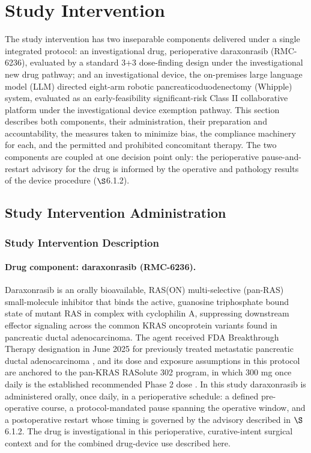 \section{Study Intervention}

The study intervention has two inseparable components delivered under a single
integrated protocol: an investigational drug, perioperative daraxonrasib
(RMC-6236), evaluated by a standard 3+3 dose-finding design under the
investigational new drug pathway; and an investigational device, the on-premises
large language model (LLM) directed eight-arm robotic pancreaticoduodenectomy
(Whipple) system, evaluated as an early-feasibility significant-risk Class II
collaborative platform under the investigational device exemption pathway. This
section describes both components, their administration, their preparation and
accountability, the measures taken to minimize bias, the compliance machinery for
each, and the permitted and prohibited concomitant therapy. The two components
are coupled at one decision point only: the perioperative pause-and-restart
advisory for the drug is informed by the operative and pathology results of the
device procedure ($\S$6.1.2).

\subsection{Study Intervention Administration}

\subsubsection{Study Intervention Description}

\paragraph{Drug component: daraxonrasib (RMC-6236).}
Daraxonrasib is an orally bioavailable, RAS(ON) multi-selective (pan-RAS)
small-molecule inhibitor that binds the active, guanosine triphosphate bound state
of mutant RAS in complex with cyclophilin A, suppressing downstream effector
signaling across the common KRAS oncoprotein variants found in pancreatic ductal
adenocarcinoma. The agent received FDA Breakthrough Therapy designation in
June 2025 for previously treated metastatic pancreatic ductal adenocarcinoma
\cite{revbreakthrough}, and its dose and exposure assumptions in this protocol are
anchored to the pan-KRAS RASolute 302 program, in which 300 mg once daily is the
established recommended Phase 2 dose \cite{rasolute302}. In this study daraxonrasib
is administered orally, once daily, in a perioperative schedule: a defined
pre-operative course, a protocol-mandated pause spanning the operative window, and
a postoperative restart whose timing is governed by the advisory described in
$\S$6.1.2. The drug is investigational in this perioperative, curative-intent
surgical context and for the combined drug-device use described here.

